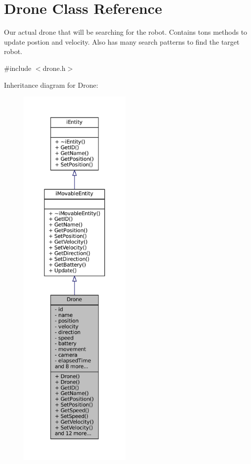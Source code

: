 \hypertarget{classDrone}{}\section{Drone Class Reference}
\label{classDrone}


Our actual drone that will be searching for the robot. Contains tons methods to update postion and velocity. Also has many search patterns to find the target robot.  




{\ttfamily \#include $<$drone.\+h$>$}



Inheritance diagram for Drone\+:\nopagebreak
\begin{figure}[H]
\begin{center}
\leavevmode
\includegraphics[height=550pt]{classDrone__inherit__graph}
\end{center}
\end{figure}



